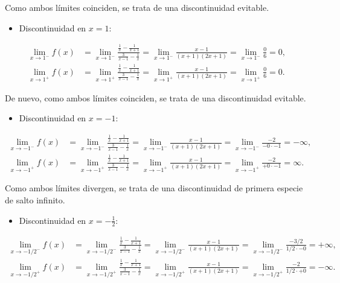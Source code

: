 \documentclass[
  spanish,
  a4paper,
]{scrreport}
\providecommand{\tightlist}{%
  \setlength{\itemsep}{0pt}\setlength{\parskip}{0pt}}
\theoremstyle{definition}
\theoremstyle{remark}
\begin{document}
\begin{tcolorbox}
\begin{enumerate}
  Como ambos límites coinciden, se trata de una discontinuidad evitable.

  \begin{itemize}
  \tightlist
  \item
    Discontinuidad en \(x=1\):
  \end{itemize}

  \begin{align*}
   \lim_{x\rightarrow 1^{-}}f(x) &= \lim_{x\rightarrow 1^{-}}\frac{\frac{1}{x}-\frac{1}{x+1}}{\frac{3}{x-1}-\frac{1}{x}} = \lim_{x\rightarrow 1^{-}}\frac{x-1}{\left( x+1\right) \left( 2x+1\right) } = \lim_{x\rightarrow 1^{-}}\frac{0}{6}=0, \\
   \lim_{x\rightarrow 1^{+}}f(x) &= \lim_{x\rightarrow 1^{+}}\frac{\frac{1}{x}-\frac{1}{x+1}}{\frac{3}{x-1}-\frac{1}{x}} = \lim_{x\rightarrow 1^{+}}\frac{x-1}{\left( x+1\right) \left( 2x+1\right) } = \lim_{x\rightarrow 1^{+}}\frac{0}{6}=0.
   \end{align*}

  De nuevo, como ambos límites coinciden, se trata de una discontinuidad
  evitable.

  \begin{itemize}
  \tightlist
  \item
    Discontinuidad en \(x=-1\):
  \end{itemize}

  \begin{align*}
   \lim_{x\rightarrow -1^{-}}f(x) &= \lim_{x\rightarrow -1^{-}}\frac{\frac{1}{x}-\frac{1}{x+1}}{\frac{3}{x-1}-\frac{1}{x}} = \lim_{x\rightarrow -1^{-}}\frac{x-1}{\left( x+1\right) \left( 2x+1\right) } = \lim_{x\rightarrow -1^{-}}\frac{-2}{-0\cdot -1}=-\infty, \\
   \lim_{x\rightarrow -1^{+}}f(x) &= \lim_{x\rightarrow -1^{+}}\frac{\frac{1}{x}-\frac{1}{x+1}}{\frac{3}{x-1}-\frac{1}{x}} = \lim_{x\rightarrow -1^{+}}\frac{x-1}{\left( x+1\right) \left( 2x+1\right) } = \lim_{x\rightarrow -1^{+}}\frac{-2}{+0\cdot -1}=\infty.
   \end{align*}

  Como ambos límites divergen, se trata de una discontinuidad de primera
  especie de salto infinito.

  \begin{itemize}
  \tightlist
  \item
    Discontinuidad en \(x=-\frac{1}{2}\):
  \end{itemize}

  \begin{align*}
   \lim_{x\rightarrow -1/2^{-}}f(x) &= \lim_{x\rightarrow -1/2^{-}}\frac{\frac{1}{x}-\frac{1}{x+1}}{\frac{3}{x-1}-\frac{1}{x}} = \lim_{x\rightarrow -1/2^{-}}\frac{x-1}{\left( x+1\right) \left( 2x+1\right) } = \lim_{x\rightarrow-1/2^{-}}\frac{-3/2}{1/2\cdot -0} = +\infty, \\
   \lim_{x\rightarrow -1/2^{+}}f(x) &= \lim_{x\rightarrow -1/2^{+}}\frac{\frac{1}{x}-\frac{1}{x+1}}{\frac{3}{x-1}-\frac{1}{x}} = \lim_{x\rightarrow -1/2^{+}}\frac{x-1}{\left( x+1\right) \left( 2x+1\right) } = \lim_{x\rightarrow-1/2^{+}}\frac{-2}{1/2\cdot +0} = -\infty.
   \end{align*}


\end{enumerate}
\end{tcolorbox}
\end{document}
